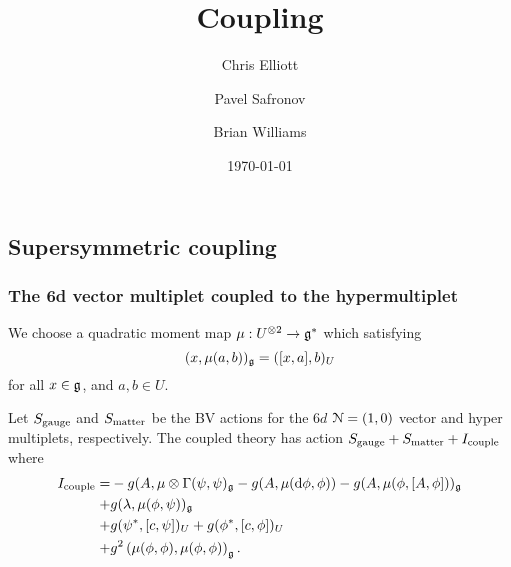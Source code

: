 \documentclass[10pt, oneside]{article}
\title{Coupling}
\author{Chris Elliott\and Pavel Safronov \and Brian Williams}
\date{\today}
\begin{document}
\maketitle

\subsection{Supersymmetric coupling}
\subsubsection{The 6d vector multiplet coupled to the hypermultiplet}


We choose a quadratic moment map $\mu : U^{\otimes 2} \to \mathfrak g^*$ which satisfying
\[
(x, \mu(a, b))_{\mathfrak g} = ([x, a], b)_U
\]
for all $x \in \mathfrak g$, and $a,b \in U$.

Let $S_{\rm gauge}$ and $S_{\rm matter}$ be the BV actions for the $6d$ $\mathcal N=(1,0)$ vector and hyper multiplets, respectively. 
The coupled theory has action $S_{\rm gauge} + S_{\rm matter} + I_{\rm couple}$ where
\begin{align*}
I_{\rm couple} = &- g (A, \mu \otimes \Gamma (\psi, \psi)_\mathfrak g - g (A, \mu({\rm d} \phi, \phi)) - g (A, \mu(\phi, [A, \phi]))_\mathfrak g \\ + & 
g (\lambda, \mu(\phi, \psi))_\mathfrak g \\ + & g (\psi^*, [c, \psi])_U + g (\phi^*, [c, \phi])_U \\ + & g^2 \left(\mu(\phi, \phi), \mu(\phi, \phi) \right)_\mathfrak g .
\end{align*}

\end{document}
